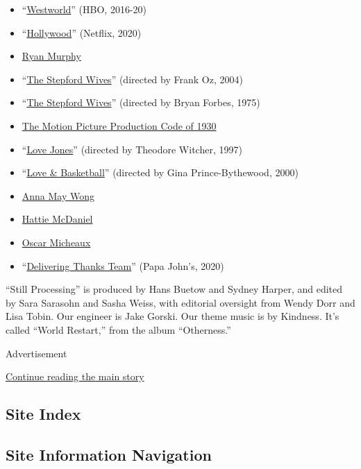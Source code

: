 \begin{itemize}
\item
  ``\href{https://www.hbo.com/westworld}{Westworld}'' (HBO, 2016-20)
\item
  ``\href{https://www.netflix.com/title/81088617}{Hollywood}'' (Netflix,
  2020)
\item
  \href{https://www.imdb.com/name/nm0614682/}{Ryan Murphy}
\item
  ``\href{https://www.imdb.com/title/tt0327162/}{The Stepford Wives}''
  (directed by Frank Oz, 2004)
\item
  ``\href{https://www.imdb.com/title/tt0073747/}{The Stepford Wives}''
  (directed by Bryan Forbes, 1975)
\item
  \href{https://www.asu.edu/courses/fms200s/total-readings/MotionPictureProductionCode.pdf}{The
  Motion Picture Production Code of 1930}
\item
  ``\href{https://www.imdb.com/title/tt0119572/}{Love Jones}'' (directed
  by Theodore Witcher, 1997)
\item
  ``\href{https://www.imdb.com/title/tt0199725/}{Love \& Basketball}''
  (directed by Gina Prince-Bythewood, 2000)
\item
  \href{https://www.imdb.com/name/nm0938923/}{Anna May Wong}
\item
  \href{https://www.imdb.com/name/nm0567408/}{Hattie McDaniel}
\item
  \href{https://www.imdb.com/name/nm0584778/}{Oscar Micheaux}
\item
  ``\href{https://www.youtube.com/watch?v=mczJdKcB1bc}{Delivering Thanks
  Team}'' (Papa John's, 2020)
\end{itemize}

``Still Processing'' is produced by Hans Buetow and Sydney Harper, and
edited by Sara Sarasohn and Sasha Weiss, with editorial oversight from
Wendy Dorr and Lisa Tobin. Our engineer is Jake Gorski. Our theme music
is by Kindness. It's called ``World Restart,'' from the album
``Otherness.''

Advertisement

\protect\hyperlink{after-bottom}{Continue reading the main story}

\hypertarget{site-index}{%
\subsection{Site Index}\label{site-index}}

\hypertarget{site-information-navigation}{%
\subsection{Site Information
Navigation}\label{site-information-navigation}}

